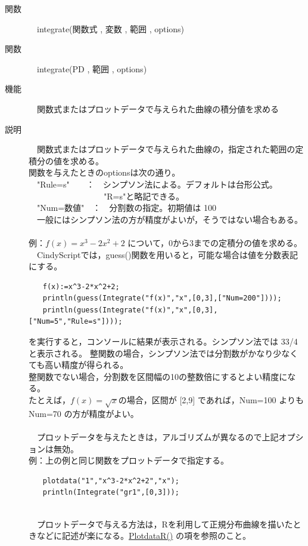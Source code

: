 \documentclass[papersize,a4paper,12pt,uplatex]{jsarticle}
\begin{document}
\begin{description}
\hypertarget{integrate}{}
\item[関数]　integrate(関数式 , 変数 , 範囲 , options)
\item[関数]　integrate(PD , 範囲 , options)
\item[機能]　関数式またはプロットデータで与えられた曲線の積分値を求める
\item[説明]　関数式またはプロットデータで与えられた曲線の，指定された範囲の定積分の値を求める。\\
関数を与えたときのoptionsは次の通り。\\
　"Rule=s"　　：　シンプソン法による。デフォルトは台形公式。\\
　　　　　　　　　"R=s"と略記できる。\\
　"Num=数値"　：　分割数の指定。初期値は 100 \\
　一般にはシンプソン法の方が精度がよいが，そうではない場合もある。\\
　\\
例：$f(x)=x^3-2x^2+2$ について，0から3までの定積分の値を求める。\\
　CindyScriptでは，guess()関数を用いると，可能な場合は値を分数表記にする。
\begin{verbatim}
　　f(x):=x^3-2*x^2+2;
　　println(guess(Integrate("f(x)","x",[0,3],["Num=200"])));
　　println(guess(Integrate("f(x)","x",[0,3],["Num=5","Rule=s"])));
\end{verbatim}
を実行すると，コンソールに結果が表示される。シンプソン法では 33/4 と表示される。
整関数の場合，シンプソン法では分割数がかなり少なくても高い精度が得られる。\\
整関数でない場合，分割数を区間幅の10の整数倍にするとよい精度になる。\\
たとえば，$f(x)=\sqrt{x} $の場合，区間が [2,9] であれば，Num=100 よりも Num=70 の方が精度がよい。\\
　\\
　プロットデータを与えたときは，アルゴリズムが異なるので上記オプションは無効。\\
例：上の例と同じ関数をプロットデータで指定する。
\begin{verbatim}
　　plotdata("1","x^3-2*x^2+2","x");
　　println(Integrate("gr1",[0,3]));
\end{verbatim}
　\\
　プロットデータで与える方法は，Rを利用して正規分布曲線を描いたときなどに記述が楽になる。\hyperlink{plotdatar}{PlotdataR()} の項を参照のこと。\\
　\\


\end{description}
\end{document}
